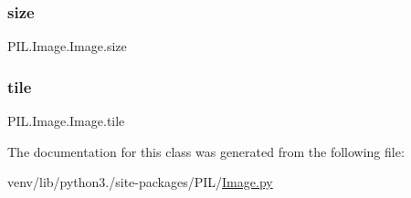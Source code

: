 \subsubsection{\texorpdfstring{size}{size}}
{\footnotesize\ttfamily P\+I\+L.\+Image.\+Image.\+size}

\mbox{\label{classPIL_1_1Image_1_1Image_aa6bdff6cdea1885a34b89c993dfe598b}} 
\subsubsection{\texorpdfstring{tile}{tile}}
{\footnotesize\ttfamily P\+I\+L.\+Image.\+Image.\+tile}



The documentation for this class was generated from the following file\+:\begin{DoxyCompactItemize}
\item 
venv/lib/python3./site-\/packages/\+P\+I\+L/\hyperlink{Image_8py}{Image.\+py}\end{DoxyCompactItemize}

